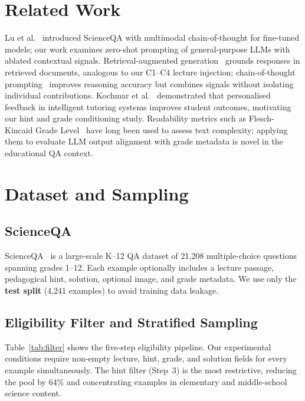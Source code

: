 \documentclass[journal]{IEEEtran}
\begin{document}
\section{Related Work}
\label{sec:related}

Lu et al.~\cite{lu2022scienceqa} introduced ScienceQA with multimodal
chain-of-thought for fine-tuned models; our work examines zero-shot
prompting of general-purpose LLMs with ablated contextual signals.
Retrieval-augmented generation~\cite{lewis2020rag} grounds responses in
retrieved documents, analogous to our C1--C4 lecture injection;
chain-of-thought prompting~\cite{wei2022chain} improves reasoning accuracy
but combines signals without isolating individual contributions.
Kochmar et al.~\cite{kochmar2022automated} demonstrated that personalised
feedback in intelligent tutoring systems improves student outcomes,
motivating our hint and grade conditioning study. Readability metrics such
as Flesch-Kincaid Grade Level~\cite{kincaid1975derivation} have long been
used to assess text complexity; applying them to evaluate LLM output
alignment with grade metadata is novel in the educational QA context.

\section{Dataset and Sampling}
\label{sec:dataset}

\subsection{ScienceQA}

ScienceQA~\cite{lu2022scienceqa,thomas2024scienceqa} is a large-scale K--12
QA dataset of 21,208 multiple-choice questions spanning grades 1--12.
Each example optionally includes a lecture passage, pedagogical hint,
solution, optional image, and grade metadata. We use only the \textbf{test
split} (4,241 examples) to avoid training data leakage.

\subsection{Eligibility Filter and Stratified Sampling}

Table~\ref{tab:filter} shows the five-step eligibility pipeline. Our
experimental conditions require non-empty lecture, hint, grade, and solution
fields for every example simultaneously. The hint filter (Step~3) is the
most restrictive, reducing the pool by 64\% and concentrating examples in
elementary and middle-school science content.
\end{document}
